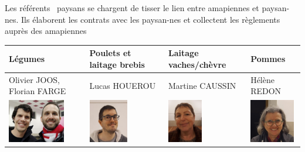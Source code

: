 \documentclass[8pt,a4paper,french]{article}
\begin{document}
\noindent Les référents \guillemotleft\ paysans \guillemotright se chargent de tisser le lien entre amapiennes et paysan-nes. Ils élaborent les contrats avec les paysan-nes et collectent les règlements auprès des amapiennes
\vspace{1em}
\begin{center}
  \begin{tabular}{ p{3.75cm}|p{3.75cm}|p{3.75cm}|p{3.75cm} }
    {\bf Légumes} & {\bf Poulets et laitage brebis} & {\bf Laitage vaches/chèvre} & {\bf Pommes} \\
    \hline\hline
    Olivier JOOS, Florian FARGE & Lucas HOUEROU & Martine CAUSSIN & Hélène REDON \\
    \includegraphics[height=1.9cm]{JOOS-FARGE.jpg} & \includegraphics[height=1.9cm]{HOUEROU.jpg} & \includegraphics[width=1.5cm]{CAUSSIN.jpg} & \includegraphics[height=1.9cm]{REDON.jpg}
  \end{tabular}
\end{center}
\vspace{1em}
\end{document}
